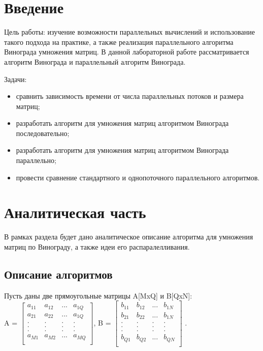 \documentclass[a4paper,12pt]{report}
\begin{document}
	\setcounter{page}{2}
	\tableofcontents
	\chapter*{Введение}

		Цель работы: изучение возможности параллельных вычислений и использование такого подхода на практике, а также реализация параллельного алгоритма Винограда умножения матриц. 
		В данной лабораторной работе рассматривается алгоритм Винограда и параллельный алгоритм Винограда.
		
		Задачи:
		\begin{itemize}
			\item сравнить зависимость времени от числа параллельных потоков и размера матриц;
			\item разработать алгоритм для умножения матриц алгоритмом Винограда последовательно;
			\item разработать алгоритм для умножения матриц алгоритмом Винограда параллельно;
			\item провести сравнение стандартного и однопоточного параллельного алгоритмов.
		\end{itemize}

    \label{sec:intro}

    \newpage

    \chapter{Аналитическая часть}
        \label{sec:analitic_part}

        	В рамках раздела будет дано аналитическое описание алгоритма для умножения матриц по Винограду, а также идеи его распаралелливания.

	\section{Описание алгоритмов}
        
        	Пусть даны две прямоугольные матрицы A[MxQ] и B[QxN]:\\
        	A = $\begin{bmatrix}
        		a_{11}& a_{12}& ...& a_{1Q}\\
        		a_{21}& a_{22}& ...& a_{1Q}\\
        		.& .& .& .\\
        		.& .& .& .\\
        		.& .& .& .\\
        		a_{M1}& a_{M2}& ...& a_{MQ}\\
        	\end{bmatrix}$, B = $\begin{bmatrix}
        		b_{11}& b_{12}& ...& b_{1N}\\
        		b_{21}& b_{22}& ...& b_{1N}\\
        		.& .& .& .\\
        		.& .& .& .\\
        		.& .& .& .\\
        		b_{Q1}& b_{Q2}& ...& b_{QN}\\
        	\end{bmatrix}$ .
        	
\end{document}
